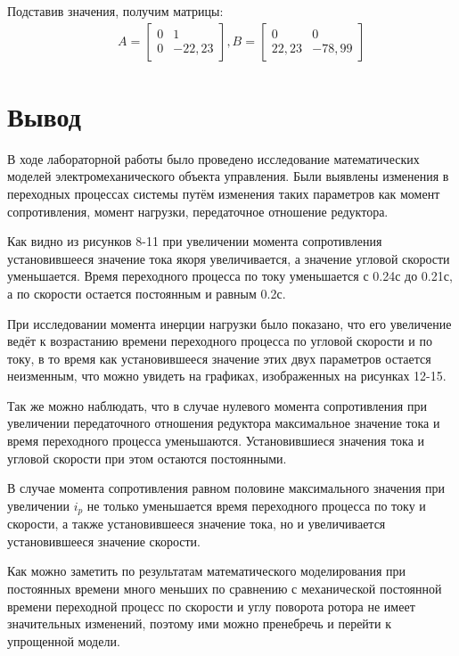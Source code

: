 \documentclass[12pt,a4paper]{article}
\begin{document}
Подставив значения, получим матрицы:
\begin{align}
	&&A =
	\begin{bmatrix}
		0 & 1\\
		0 & -22,23
	\end{bmatrix}, B = 
	\begin{bmatrix}
		0 & 0\\
		22,23 & -78,99
	\end{bmatrix}
\end{align}

\newpage
\section*{Вывод}

В ходе лабораторной работы было проведено исследование математических моделей электромеханического объекта управления. Были выявлены изменения в переходных процессах системы путём изменения таких параметров как момент сопротивления, момент нагрузки, передаточное отношение редуктора.\par
Как видно из рисунков 8-11 при увеличении момента сопротивления установившееся значение тока якоря увеличивается, а значение угловой скорости уменьшается. Время переходного процесса по току уменьшается с 0.24с до 0.21с, а по скорости остается постоянным и равным 0.2с.\par
При исследовании момента инерции нагрузки было показано, что его увеличение ведёт к возрастанию времени переходного процесса по угловой скорости и по току, в то время как установившееся значение этих двух параметров остается неизменным, что можно увидеть на графиках, изображенных на рисунках 12-15.\par
Так же можно наблюдать, что в случае нулевого момента сопротивления при увеличении передаточного отношения редуктора максимальное значение тока и время переходного процесса уменьшаются. Установившиеся значения тока и угловой скорости при этом остаются постоянными.\par
В случае момента сопротивления равном половине максимального значения при увеличении $i_p$ не только уменьшается время переходного процесса по току и скорости, а также установившееся значение тока, но и увеличивается установившееся значение скорости.\par
Как можно заметить по результатам математического моделирования при постоянных времени много меньших по сравнению с механической постоянной времени переходной процесс по скорости и углу поворота ротора не имеет значительных изменений, поэтому ими можно пренебречь и перейти к упрощенной модели.
\end{document}
